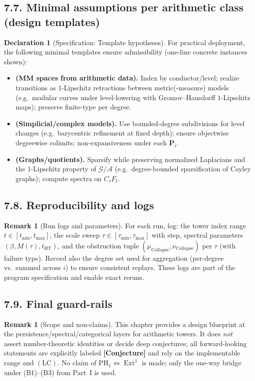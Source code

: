 \documentclass[11pt]{article}
\DeclareMathOperator{\Ext}{Ext}
\DeclareRobustCommand{\hyp}{\nobreakdash-}
\numberwithin{equation}{section}
\theoremstyle{definition}
\newtheorem{remark}[theorem]{Remark}
\newtheorem{declaration}[theorem]{Declaration}
\DeclareRobustCommand{\muc}{\mu_{\mathrm{Collapse}}}
\DeclareRobustCommand{\nuc}{\nu_{\mathrm{Collapse}}}
\DeclareRobustCommand{\LC}{\texorpdfstring{\ensuremath{\mathrm{(LC)}}}{(LC)}}
\begin{document}
\subsection*{7.7. Minimal assumptions per arithmetic class (design templates)}
\begin{declaration}[Specification: Template hypotheses]\label{spec:templates}
For practical deployment, the following minimal templates ensure admissibility (one\hyp line concrete instances shown):
\begin{itemize}
  \item \textbf{(MM spaces from arithmetic data).} Index by conductor/level; realize transitions as \(1\)\hyp Lipschitz retractions between metric(\hyp measure) models (e.g.\ modular curves under level\hyp lowering with Gromov–Hausdorff \(1\)\hyp Lipschitz maps); preserve finite\hyp type per degree.
  \item \textbf{(Simplicial/complex models).} Use bounded\hyp degree subdivisions for level changes (e.g.\ barycentric refinement at fixed depth); ensure objectwise degreewise colimits; non\hyp expansiveness under each \(\mathbf{P}_i\).
  \item \textbf{(Graphs/quotients).} Sparsify while preserving normalized Laplacians and the \(1\)\hyp Lipschitz property of \(\mathcal{G}\)/\(\mathcal{A}\) (e.g.\ degree\hyp bounded sparsification of Cayley graphs); compute spectra on \(C_\tau F_t\).
\end{itemize}
\end{declaration}

\subsection*{7.8. Reproducibility and logs}
\begin{remark}[Run logs and parameters]\label{rk:logs}
For each run, log: the tower index range \(t\in[t_{\min},t_{\max}]\), the scale sweep \(\tau\in[\tau_{\min},\tau_{\max}]\) with step, spectral parameters \((\beta,M(\tau),t_{\mathrm{HT}})\), and the obstruction tuple \((\muc,\nuc)\) per \(\tau\) (with failure type).
Record also the degree set used for aggregation (per\hyp degree vs.\ summed across \(i\)) to ensure consistent replays.
These logs are part of the program specification and enable exact reruns.
\end{remark}

\subsection*{7.9. Final guard-rails}
\begin{remark}[Scope and non-claims]\label{rk:nonclaims}
This chapter provides a design blueprint at the persistence/spectral/categorical layers for arithmetic towers.
It does \emph{not} assert number\hyp theoretic identities or decide deep conjectures; all forward\hyp looking statements are explicitly labeled \textbf{[Conjecture]} and rely on the implementable range and \LC.
No claim of \(\mathrm{PH}_1\Leftrightarrow\Ext^1\) is made; only the one\hyp way bridge under \textup{(B1)–(B3)} from Part~I is used.
\end{remark}
\end{document}
